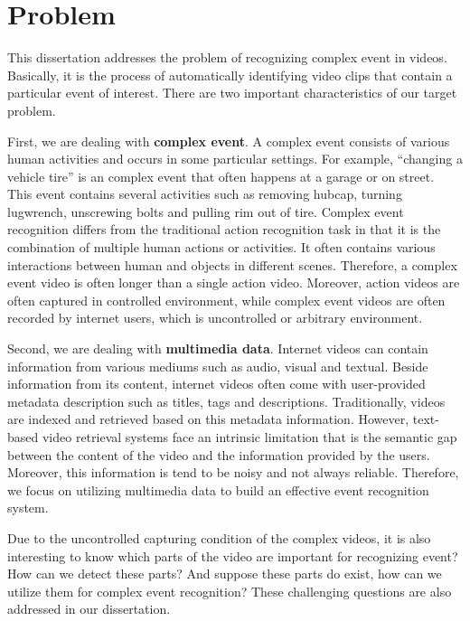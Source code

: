 \section{Problem}
\label{c1_problemdefinition}
This dissertation addresses the problem of recognizing complex event in videos. Basically, it is the process of automatically identifying video clips that contain a particular event of interest. There are two important characteristics of our target problem. 

First, we are dealing with \textbf{complex event}. A complex event consists of various human activities and occurs in some particular settings. For example, ``changing a vehicle tire'' is an complex event that often happens at a garage or on street. This event contains several activities such as removing hubcap, turning lugwrench, unscrewing bolts and pulling rim out of tire. Complex event recognition differs from the traditional action recognition  task in that it is the combination of multiple human actions or activities. It often contains various interactions between human and objects in different scenes. Therefore, a complex event video is often longer than a single action video. Moreover, action videos are often captured in controlled environment, while complex event videos are often recorded by internet users, which is uncontrolled or arbitrary environment. 

Second, we are dealing with \textbf{multimedia data}. Internet videos can contain information from various mediums such as audio, visual and textual. Beside information from its content, internet videos often come with user-provided metadata description such as titles, tags and descriptions. Traditionally, videos are indexed and retrieved based on this metadata information. However, text-based video retrieval systems face an intrinsic limitation that is the semantic gap  between the content of the video and the information provided by the users. Moreover, this information is tend to be noisy and not always reliable. Therefore, we focus on utilizing multimedia data to build an effective event recognition system.

Due to the uncontrolled capturing condition of the complex videos, it is also interesting to know which parts of the video are important for recognizing event? How can we detect these parts? And suppose these parts do exist, how can we utilize them for complex event recognition? These challenging questions are also addressed in our dissertation.  

